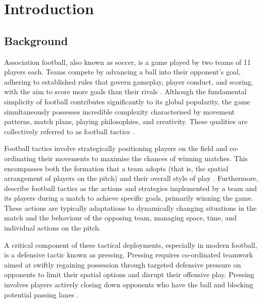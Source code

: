 \documentclass[12pt]{article}
\begin{document}
\tableofcontents
\pagebreak

\section{Introduction}


\subsection{Background}

Association football, also known as soccer, is a game played by two teams of 11 players each. Teams compete by advancing a ball into their opponent's goal, adhering to established rules that govern gameplay, player conduct, and scoring, with the aim to score more goals than their rivals \citep{memmert_data_2018, sumpter_soccermatics_2016}. Although the fundamental simplicity of football contributes significantly to its global popularity, the game simultaneously possesses incredible complexity characterised by movement patterns, match plans, playing philosophies, and creativity. These qualities are collectively referred to as football tactics \citep{memmert_data_2018}.

Football tactics involve strategically positioning players on the field and co-ordinating their movements to maximise the chances of winning matches. This encompasses both the formation that a team adopts (that is, the spatial arrangement of players on the pitch) and their overall style of play \citep{wilson_inverting_2010}. Furthermore, \citet{rein_big_2016} describe football tactics as the actions and strategies implemented by a team and its players during a match to achieve specific goals, primarily winning the game. These actions are typically adaptations to dynamically changing situations in the match and the behaviour of the opposing team, managing space, time, and individual actions on the pitch.

A critical component of these tactical deployments, especially in modern football, is a defensive tactic known as pressing. Pressing requires co-ordinated teamwork aimed at swiftly regaining possession through targeted defensive pressure on opponents to limit their spatial options and disrupt their offensive play. Pressing involves players actively closing down opponents who have the ball and blocking potential passing lanes \citep{borbely_all_2018}.
\end{document}
